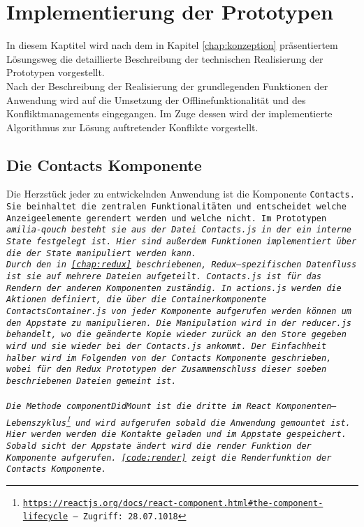 \chapter{\label{chap:implementierung}Implementierung der Prototypen}
In diesem Kaptitel wird nach dem in Kapitel \ref{chap:konzeption} präsentiertem Lösungsweg die detaillierte Beschreibung der technischen Realisierung der Prototypen vorgestellt.\\
Nach der Beschreibung der Realisierung der grundlegenden Funktionen der Anwendung wird auf die Umsetzung der Offlinefunktionalität und des Konfliktmanagements eingegangen.
Im Zuge dessen wird der implementierte Algorithmus zur Lösung auftretender Konflikte vorgestellt.
%
%
%
\section{Die Contacts Komponente}
Die Herzstück jeder zu entwickelnden Anwendung ist die Komponente \tt{Contacts}.
Sie beinhaltet die zentralen Funktionalitäten und entscheidet welche Anzeigeelemente gerendert werden und welche nicht.
Im Prototypen \it{amilia-qouch} besteht sie aus der Datei \tt{Contacts.js} in der ein interne State festgelegt ist. Hier sind außerdem Funktionen implementiert über die der State manipuliert werden kann.\\
Durch den in \autoref{chap:redux} beschriebenen, Redux--spezifischen Datenfluss ist sie auf mehrere Dateien aufgeteilt.
\tt{Contacts.js} ist für das Rendern der anderen Komponenten zuständig. 
In \tt{actions.js} werden die Aktionen definiert, die über die Containerkomponente \tt{ContactsContainer.js} von jeder Komponente aufgerufen werden können um den \gls{App}state zu manipulieren.
Die Manipulation wird in der \tt{reducer.js} behandelt, wo die geänderte Kopie wieder zurück an den \tt{Store} gegeben wird und sie wieder bei der \tt{Contacts.js} ankommt.
Der Einfachheit halber wird im Folgenden von der \tt{Contacts} Komponente geschrieben, wobei für den Redux Prototypen der Zusammenschluss dieser soeben beschriebenen Dateien gemeint ist.\\\\
Die Methode \tt{componentDidMount} ist die dritte im React Komponenten--Lebenszyklus\footnote{ \url{https://reactjs.org/docs/react-component.html\#the-component-lifecycle} -- Zugriff: 28.07.1018} und wird aufgerufen sobald die Anwendung gemountet ist.
Hier werden werden die Kontakte geladen und im \gls{App}state gespeichert.
Sobald sicht der \gls{App}state ändert wird die \tt{render} Funktion der Komponente aufgerufen. \autoref{code:render} zeigt die Renderfunktion der \tt{Contacts} Komponente.
